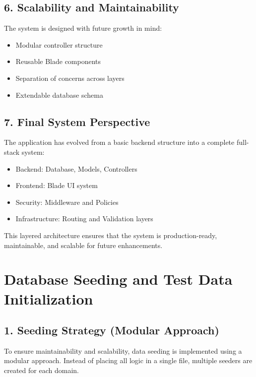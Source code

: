 \documentclass[12pt,a4paper]{article}
\begin{document}
\subsection{6. Scalability and Maintainability}

The system is designed with future growth in mind:

\begin{itemize}[noitemsep]
    \item Modular controller structure
    \item Reusable Blade components
    \item Separation of concerns across layers
    \item Extendable database schema
\end{itemize}

\subsection{7. Final System Perspective}

The application has evolved from a basic backend structure into a complete full-stack system:

\begin{itemize}[noitemsep]
    \item Backend: Database, Models, Controllers
    \item Frontend: Blade UI system
    \item Security: Middleware and Policies
    \item Infrastructure: Routing and Validation layers
\end{itemize}

This layered architecture ensures that the system is production-ready, maintainable, and scalable for future enhancements.


\section{Database Seeding and Test Data Initialization}

\subsection{1. Seeding Strategy (Modular Approach)}

To ensure maintainability and scalability, data seeding is implemented using a modular approach. Instead of placing all logic in a single file, multiple seeders are created for each domain.
\end{document}
